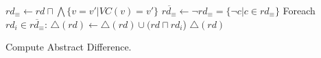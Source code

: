 \begin{algorithm}
\small
\DontPrintSemicolon
\SetAlgoLined
{}
$rd_{\equiv} \leftarrow rd \sqcap \bigwedge\{ v = v' | VC(v) = v'\}$\;
$\overline{rd_{\equiv}} \leftarrow \neg rd_{\equiv} = \{ \neg c | c \in rd_{\equiv}\}$\;
Foreach $rd_i \in \overline{rd_{\equiv}}$:
    $\triangle(rd) \leftarrow \triangle(rd) \cup (rd \sqcap rd_i$)\;
\Return $\triangle(rd)$
\caption{Compute Abstract Difference.}\label{Alg:AbsDiff}
\end{algorithm}
\setcounter{algocf}{1}
